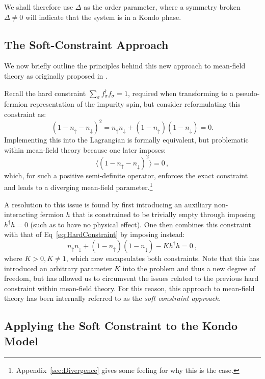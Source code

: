 We shall therefore use $ \Delta $ as the order parameter, where a symmetry broken $ \Delta \neq 0 $ will indicate that the system is in a Kondo phase.

\subsection{The Soft-Constraint Approach}

We now briefly outline the principles behind this new approach to mean-field theory as originally proposed in \cite{Draft}.

Recall the hard constraint $ \sum_{\sigma} f^{\dagger}_{\sigma} f^{}_{\sigma} = 1 $, required when transforming to a pseudo-fermion representation of the impurity spin, but consider reformulating this constraint as: \begin{equation} (1 - n_{\uparrow} - n_{\downarrow})^2 = n_{\uparrow} n_{\downarrow} + (1 - n_{\uparrow})(1 - n_{\downarrow}) = 0 . \label{eq:HardConstraint}\end{equation} Implementing this into the Lagrangian is formally equivalent, but problematic within mean-field theory because one later imposes: \[ \langle (1 - n_{\uparrow} - n_{\downarrow})^2 \rangle = 0\,, \] which, for such a positive semi-definite operator, enforces the exact constraint and leads to a diverging mean-field parameter.\footnote{Appendix~\ref{sec:Divergence} gives some feeling for why this is the case.}

A resolution to this issue is found by first introducing an auxiliary non-interacting fermion $ h $ that is constrained to be trivially empty through imposing $ h^{\dagger} h = 0 $ (such as to have no physical effect). One then combines this constraint with that of Eq~\eqref{eq:HardConstraint} by imposing instead:
\begin{equation} n_{\uparrow} n_{\downarrow} + (1 - n_{\uparrow})(1 - n_{\downarrow}) - K h^{\dagger} h = 0~,
\label{eq:soft_constraint}
\end{equation}
where $ K > 0, K \neq 1 $, which now encapsulates both constraints. Note that this has introduced an arbitrary parameter $ K $ into the problem and thus a new degree of freedom, but has allowed us to circumvent the issues related to the previous hard constraint within mean-field theory. For this reason, this approach to mean-field theory has been internally referred to as the \emph{soft constraint approach}.

\subsection{Applying the Soft Constraint to the Kondo Model}

